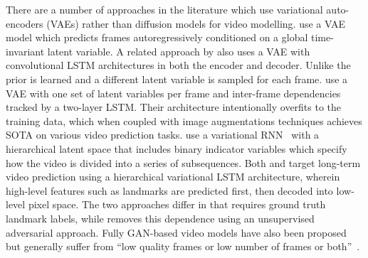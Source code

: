 There are a number of approaches in the literature which use variational auto-encoders (VAEs) rather than diffusion models for video modelling. \citet{babaeizadeh2017stochastic} use a VAE model which predicts frames autoregressively conditioned on a global time-invariant latent variable. A related approach by \citet{denton2018stochastic} also uses a VAE with convolutional LSTM architectures in both the encoder and decoder. Unlike \citet{babaeizadeh2017stochastic} the prior is learned and a different latent variable is sampled for each frame. \citet{babaeizadeh2021fitvid} use a VAE with one set of latent variables per frame and inter-frame dependencies tracked by a two-layer LSTM. Their architecture intentionally overfits to the training data, which when coupled with image augmentations techniques achieves SOTA on various video prediction tasks.  \citet{kim2019variational} use a variational RNN~\citep{chung2015recurrent} with a hierarchical latent space that includes binary indicator variables which specify how the video is divided into a series of subsequences. Both \citet{villegas2018hierarchical} and \citet{wichers2018learning} target long-term video prediction using a hierarchical variational LSTM architecture, wherein high-level features such as landmarks are predicted first, then decoded into low-level pixel space. The two approaches differ in that \citet{villegas2018hierarchical} requires ground truth landmark labels, while \cite{wichers2018learning} removes this dependence using an unsupervised adversarial approach. Fully GAN-based video models have also been proposed~\citep{aldausari2022video,clark2019adversarial} but generally suffer from ``low quality frames or low number of frames or both''~\citep{aldausari2022video}.

